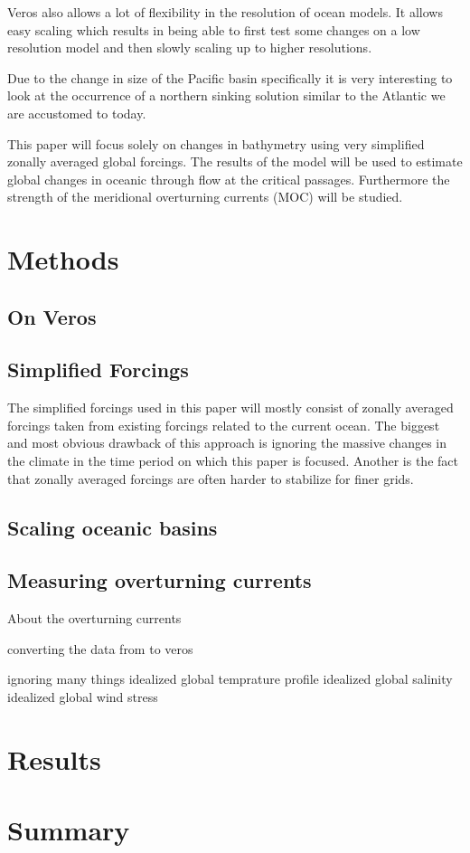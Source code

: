 \documentclass[a4paper]{article}
\begin{document}
\begin{multicols}{2}
Veros also allows a lot of flexibility in the resolution of ocean models. It allows easy scaling which results in being able to first test some changes on a low resolution model and then slowly scaling up to higher resolutions.

Due to the change in size of the Pacific basin specifically it is very interesting to look at the occurrence of a northern sinking solution similar to the Atlantic we are accustomed to today.

This paper will focus solely on changes in bathymetry using very simplified zonally averaged global forcings. The results of the model will be used to estimate global changes in oceanic through flow at the critical passages. Furthermore the strength of the meridional overturning currents (MOC) will be studied.




\section{Methods}
\subsection{On Veros}
\subsection{Simplified Forcings}
The simplified forcings used in this paper will mostly consist of zonally averaged forcings taken from existing forcings related to the current ocean. The biggest and most obvious drawback of this approach is ignoring the massive changes in the climate in the time period on which this paper is focused. Another is the fact that zonally averaged forcings are often harder to stabilize for finer grids.


\subsection{Scaling oceanic basins}
\subsection{Measuring overturning currents}
About the overturning currents

converting the data from \cite{Muller2008Mar} to veros

ignoring many things
idealized global temprature profile
idealized global salinity
idealized global wind stress


\section{Results}

\section{Summary}

\printbibliography

\end{multicols}
\end{document}
